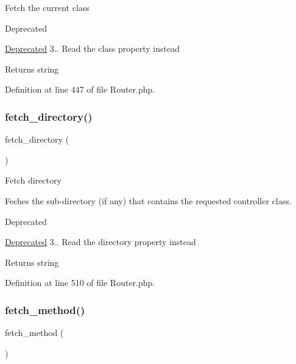 Fetch the current class

\begin{DoxyRefDesc}{Deprecated}
\item[\mbox{\hyperlink{deprecated__deprecated000003}{Deprecated}}]3.. Read the \textquotesingle{}class\textquotesingle{} property instead \end{DoxyRefDesc}
\begin{DoxyReturn}{Returns}
string 
\end{DoxyReturn}


Definition at line 447 of file Router.\+php.

\mbox{\label{class_c_i___router_a7a089f2cfae731dcc9e59a71d20208ef}} 
\subsubsection{\texorpdfstring{fetch\_directory()}{fetch\_directory()}}
{\footnotesize\ttfamily fetch\+\_\+directory (\begin{DoxyParamCaption}{ }\end{DoxyParamCaption})}

Fetch directory

Feches the sub-\/directory (if any) that contains the requested controller class.

\begin{DoxyRefDesc}{Deprecated}
\item[\mbox{\hyperlink{deprecated__deprecated000005}{Deprecated}}]3.. Read the \textquotesingle{}directory\textquotesingle{} property instead \end{DoxyRefDesc}
\begin{DoxyReturn}{Returns}
string 
\end{DoxyReturn}


Definition at line 510 of file Router.\+php.

\mbox{\label{class_c_i___router_ad408b28e3a095e7435f21e95d93e7714}} 
\subsubsection{\texorpdfstring{fetch\_method()}{fetch\_method()}}
{\footnotesize\ttfamily fetch\+\_\+method (\begin{DoxyParamCaption}{ }\end{DoxyParamCaption})}

